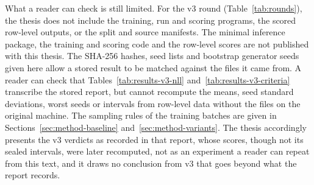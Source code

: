 What a reader can check is still limited. For the v3 round
(Table~\ref{tab:rounds}), the thesis does not include the training, run and scoring
programs, the scored row-level outputs, or the split and source
manifests. The minimal inference package, the training and scoring
code and the row-level scores are not published with this thesis. The
SHA-256 hashes, seed lists and bootstrap generator seeds given here
allow a stored result to be matched against the files it came from. A
reader can check that
Tables~\ref{tab:results-v3-nll} and~\ref{tab:results-v3-criteria}
transcribe the stored report, but cannot recompute the means, seed standard
deviations, worst seeds or intervals from row-level data without the
files on the original machine. The
sampling rules of the training batches are given in
Sections~\ref{sec:method-baseline} and~\ref{sec:method-variants}. The
thesis accordingly presents the v3 verdicts as recorded in that report,
whose scores, though not its sealed intervals, were later recomputed,
not as an experiment a reader can repeat from this text, and it draws no
conclusion from v3 that goes beyond what the report records.

